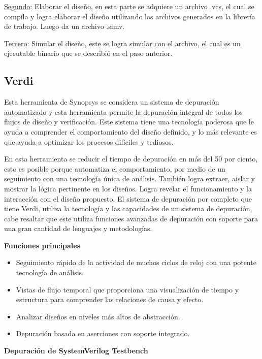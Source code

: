   \underline{Segundo}: Elaborar el diseño, en esta parte se adquiere un archivo .vcs, el cual se compila y logra elaborar el diseño utilizando los archivos generados en la librería de trabajo. Luego da un archivo .simv.
  
  \underline{Tercero}: Simular el diseño, este se logra simular con el archivo, el cual es un ejecutable binario que se describió en el paso anterior.

 \cite{Jeff} 
  
  \subsection*{Verdi}
 Esta herramienta de Synopsys se considera un sistema de depuración automatizado y esta herramienta permite la depuración integral de todos los flujos de diseño y verificación.  Este sistema tiene una tecnología poderosa que le ayuda a comprender el comportamiento del diseño definido, y lo más relevante es que ayuda a optimizar los procesos difíciles y tediosos.
  
  En esta herramienta se reducir el tiempo de depuración en más del 50 por ciento, esto es posible porque automatiza el comportamiento, por medio de un seguimiento con una tecnología única de análisis. También logra extraer, aislar y mostrar la lógica pertinente en los diseños. Logra revelar el funcionamiento y la interacción con el diseño propuesto.
  El sistema de depuración por completo que tiene Verdi, utiliza la tecnología y las capacidades de un sistema de depuración, cabe resaltar que este utiliza funciones avanzadas de depuración con soporte para una gran cantidad de lenguajes y metodologías.

  \cite{verdi} 
  \textbf{Funciones principales}  
  
  \begin{itemize}
   \item Seguimiento rápido de la actividad de muchos ciclos de reloj con una potente tecnología de análisis.
    \item Vistas de flujo temporal que proporciona una visualización de tiempo y estructura para comprender las relaciones de causa y efecto.
    \item Analizar diseños en niveles más altos de abstracción.
    \item Depuración basada en aserciones con soporte integrado.

\end{itemize}

\textbf{Depuración de SystemVerilog Testbench}

